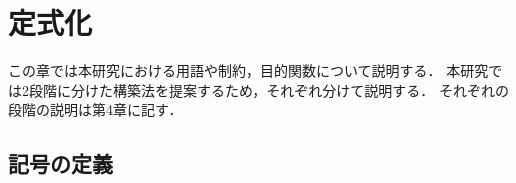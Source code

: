 \chapter{定式化}\label{formulation}

この章では本研究における用語や制約，目的関数について説明する．
本研究では2段階に分けた構築法を提案するため，それぞれ分けて説明する．
それぞれの段階の説明は第4章に記す．

\section{記号の定義}

    




    
